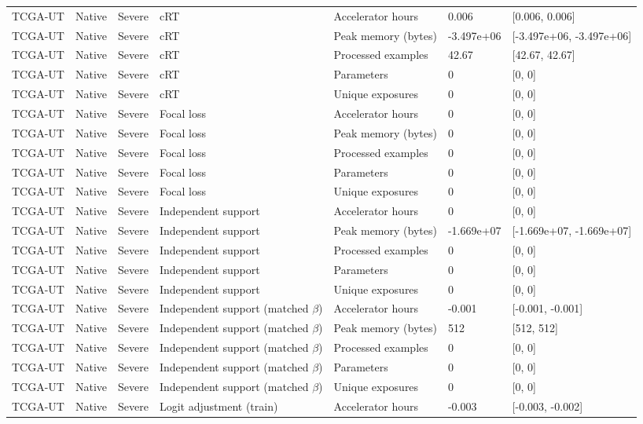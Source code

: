 \begin{longtable}{lllllll}
TCGA-UT & Native & Severe & cRT & Accelerator hours & 0.006 & [0.006, 0.006] \\
TCGA-UT & Native & Severe & cRT & Peak memory (bytes) & -3.497e+06 & [-3.497e+06, -3.497e+06] \\
TCGA-UT & Native & Severe & cRT & Processed examples & 42.67 & [42.67, 42.67] \\
TCGA-UT & Native & Severe & cRT & Parameters & 0 & [0, 0] \\
TCGA-UT & Native & Severe & cRT & Unique exposures & 0 & [0, 0] \\
TCGA-UT & Native & Severe & Focal loss & Accelerator hours & 0 & [0, 0] \\
TCGA-UT & Native & Severe & Focal loss & Peak memory (bytes) & 0 & [0, 0] \\
TCGA-UT & Native & Severe & Focal loss & Processed examples & 0 & [0, 0] \\
TCGA-UT & Native & Severe & Focal loss & Parameters & 0 & [0, 0] \\
TCGA-UT & Native & Severe & Focal loss & Unique exposures & 0 & [0, 0] \\
TCGA-UT & Native & Severe & Independent support & Accelerator hours & 0 & [0, 0] \\
TCGA-UT & Native & Severe & Independent support & Peak memory (bytes) & -1.669e+07 & [-1.669e+07, -1.669e+07] \\
TCGA-UT & Native & Severe & Independent support & Processed examples & 0 & [0, 0] \\
TCGA-UT & Native & Severe & Independent support & Parameters & 0 & [0, 0] \\
TCGA-UT & Native & Severe & Independent support & Unique exposures & 0 & [0, 0] \\
TCGA-UT & Native & Severe & Independent support (matched $\beta$) & Accelerator hours & -0.001 & [-0.001, -0.001] \\
TCGA-UT & Native & Severe & Independent support (matched $\beta$) & Peak memory (bytes) & 512 & [512, 512] \\
TCGA-UT & Native & Severe & Independent support (matched $\beta$) & Processed examples & 0 & [0, 0] \\
TCGA-UT & Native & Severe & Independent support (matched $\beta$) & Parameters & 0 & [0, 0] \\
TCGA-UT & Native & Severe & Independent support (matched $\beta$) & Unique exposures & 0 & [0, 0] \\
TCGA-UT & Native & Severe & Logit adjustment (train) & Accelerator hours & -0.003 & [-0.003, -0.002] \\

\end{longtable}

